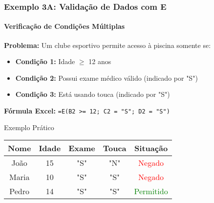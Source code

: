 \documentclass[12pt]{beamer}
\begin{document}
\begin{frame}
    \frametitle{Exemplo 3A: Validação de Dados com E}
    \framesubtitle{Verificação de Condições Múltiplas}

    \textbf{Problema:} Um clube esportivo permite acesso à piscina somente se:
    \begin{itemize}
        \item \textbf{Condição 1:} Idade $\geq$ 12 anos
        \item \textbf{Condição 2:} Possui exame médico válido (indicado por "S")
        \item \textbf{Condição 3:} Está usando touca (indicado por "S")
    \end{itemize}

    \textbf{Fórmula Excel:}
    \texttt{=E(B2 >= 12; C2 = "S"; D2 = "S")}

    \begin{exampleblock}{Exemplo Prático}
        \begin{tabular}{|c|c|c|c|c|}
            \hline
            \textbf{Nome} & \textbf{Idade} & \textbf{Exame} & \textbf{Touca} & \textbf{Situação} \\ \hline
            João & 15 & "S" & "N" & \textcolor{red}{Negado} \\ \hline
            Maria & 10 & "S" & "S" &  \textcolor{red}{Negado} \\ \hline
            Pedro & 14 & "S" & "S" &  \textcolor{green}{Permitido} \\ \hline
        \end{tabular}
    \end{exampleblock}
\end{frame}
\end{document}
